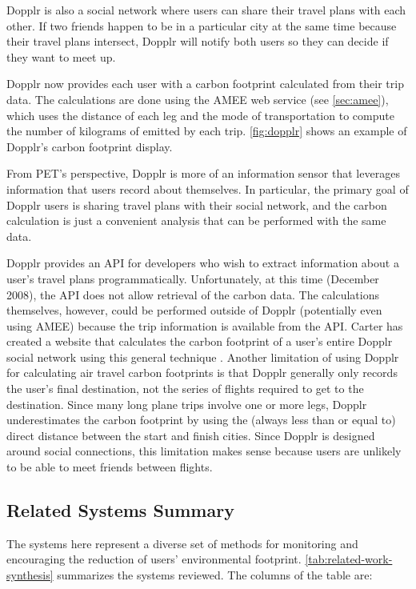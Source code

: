 Dopplr is also a social network where users can share their travel plans with each other. If two friends happen to be in a particular city at the same time because their travel plans intersect, Dopplr will notify both users so they can decide if they want to meet up.

Dopplr now provides each user with a carbon footprint calculated from their trip data. The calculations are done using the AMEE web service (see \autoref{sec:amee}), which uses the distance of each leg and the mode of transportation to compute the number of kilograms of \COtwo emitted by each trip. \autoref{fig:dopplr} shows an example of Dopplr's carbon footprint display.

From PET's perspective, Dopplr is more of an information sensor that leverages information that users record about themselves. In particular, the primary goal of Dopplr users is sharing travel plans with their social network, and the carbon calculation is just a convenient analysis that can be performed with the same data.

Dopplr provides an API for developers who wish to extract information about a user's travel plans programmatically. Unfortunately, at this time (December 2008), the API does not allow retrieval of the carbon data. The calculations themselves, however, could be performed outside of Dopplr (potentially even using AMEE) because the trip information is available from the API. Carter has created a website that calculates the carbon footprint of a user's entire Dopplr social network using this general technique \cite{offsetr-website}. Another limitation of using Dopplr for calculating air travel carbon footprints is that Dopplr generally only records the user's final destination, not the series of flights required to get to the destination. Since many long plane trips involve one or more legs, Dopplr underestimates the carbon footprint by using the (always less than or equal to) direct distance between the start and finish cities. Since Dopplr is designed around social connections, this limitation makes sense because users are unlikely to be able to meet friends between flights.

\subsection{Related Systems Summary}

The systems here represent a diverse set of methods for monitoring and encouraging the reduction of users' environmental footprint. \autoref{tab:related-work-synthesis} summarizes the systems reviewed. The columns of the table are:

